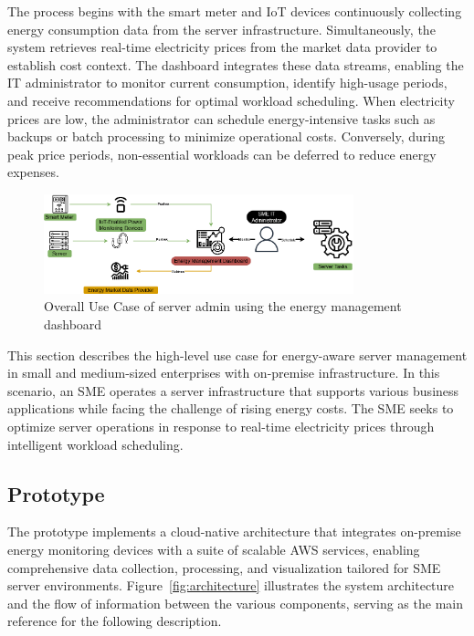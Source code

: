 The process begins with the smart meter and IoT devices continuously collecting energy consumption data from the server infrastructure. Simultaneously, the system retrieves real-time electricity prices from the market data provider to establish cost context. The dashboard integrates these data streams, enabling the IT administrator to monitor current consumption, identify high-usage periods, and receive recommendations for optimal workload scheduling. When electricity prices are low, the administrator can schedule energy-intensive tasks such as backups or batch processing to minimize operational costs. Conversely, during peak price periods, non-essential workloads can be deferred to reduce energy expenses.
\begin{figure}[htbp]
    \centering
    \includegraphics[width=0.8\textwidth]{fig/high_level_use_case.png}
    \caption{Overall Use Case of server admin using the energy management dashboard}
    \label{fig:highleveluse}
\end{figure}
This section describes the high-level use case for energy-aware server management in small and medium-sized enterprises with on-premise infrastructure. In this scenario, an SME operates a server infrastructure that supports various business applications while facing the challenge of rising energy costs. The SME seeks to optimize server operations in response to real-time electricity prices through intelligent workload scheduling.
\subsection{Prototype}
The prototype implements a cloud-native architecture that integrates on-premise energy monitoring devices with a suite of scalable AWS services, enabling comprehensive data collection, processing, and visualization tailored for SME server environments. Figure~\ref{fig:architecture} illustrates the system architecture and the flow of information between the various components, serving as the main reference for the following description.

